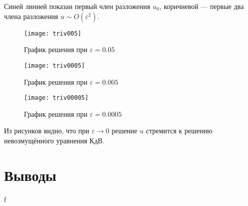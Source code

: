 Синей линией показан первый член разложения $u_0$,
коричневой --- первые два члена разложения $u \sim O(\varepsilon^2)$.

\begin{figure}[H]
    \centering
    \texttt{[image: triv005]}
    \caption{График решения при $\varepsilon = 0.05$}
\end{figure}
\begin{figure}[H]
    \centering
    \texttt{[image: triv0005]}
    \caption{График решения при $\varepsilon = 0.005$}
\end{figure}
\begin{figure}[H]
    \centering
    \texttt{[image: triv00005]}
    \caption{График решения при $\varepsilon = 0.0005$}
\end{figure}

Из рисунков видно, что при $\varepsilon \to 0$
решение $u$ стремится к решению невозмущённого уравнения КдВ.

\section*{Выводы}

f
